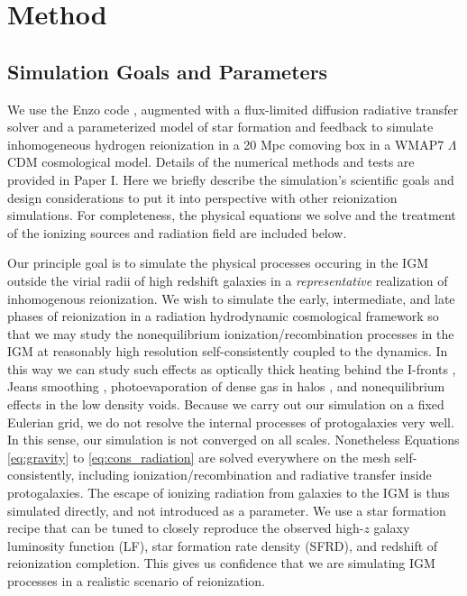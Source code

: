 \section{Method}
\label{Method}
\subsection{Simulation Goals and Parameters}
We use the Enzo code \citep{TheEnzoCollaboration}, augmented with a flux-limited diffusion radiative transfer solver and a parameterized model of star formation and feedback \citep{NormanEtAl2013} to simulate inhomogeneous hydrogen reionization in a 20 Mpc comoving box in a WMAP7 $\Lambda$CDM cosmological model. Details of the numerical methods and tests are provided in Paper I.  Here we briefly describe the simulation's scientific goals and design considerations to put it into perspective with other reionization simulations. For completeness, the physical equations we solve and the treatment of the ionizing sources and radiation field are included below.

Our principle
goal is to simulate the physical processes occuring in the IGM outside the virial radii of high redshift galaxies in a {\em representative} realization of inhomogenous reionization. We wish to simulate the early, intermediate, and late phases of reionization  in a radiation hydrodynamic cosmological  framework so that we may study the nonequilibrium ionization/recombination processes in the IGM at reasonably high resolution self-consistently coupled to the dynamics. In this way we can study such effects as optically thick heating behind the I-fronts \citep{AbelHaehnelt1999}, Jeans smoothing \citep{ShapiroEtAl1994,Gnedin2000b}, photoevaporation of dense gas in halos \citep{ShapiroEtAl2004}, and nonequilibrium effects in the low density voids. Because we carry out our simulation on a fixed Eulerian grid, we do not resolve the internal processes of protogalaxies very well. In this sense, our simulation is not converged on all scales. Nonetheless Equations \eqref{eq:gravity} to  \eqref{eq:cons_radiation} are solved everywhere on the mesh self-consistently, including ionization/recombination and radiative transfer inside protogalaxies. The escape of ionizing radiation from galaxies to the IGM is thus simulated directly, and not introduced as a parameter. We use a star formation recipe that can be tuned to closely reproduce the observed high-$z$ galaxy luminosity function (LF), star formation rate density (SFRD), and redshift of reionization completion. This gives us confidence that we are simulating IGM processes in a realistic scenario of reionization. 

